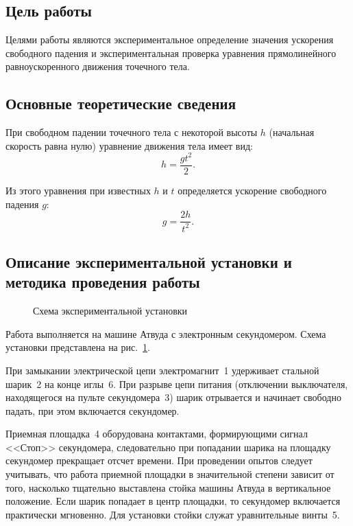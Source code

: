 \documentclass[a4paper, 12pt]{extarticle}
\begin{document}
\MTDTitlePage
\MTDInfoPage

\setcounter{section}{1}

\subsection{Цель работы}
Целями работы являются экспериментальное определение значения ускорения свободного падения и экспериментальная проверка уравнения прямолинейного равноускоренного движения точечного тела. 

\subsection{Основные теоретические сведения}
При свободном падении точечного тела с некоторой высоты $h$ (начальная скорость равна нулю) уравнение движения тела имеет вид: %
\begin{equation}
\label{eq:m1-free-fall-h}
h = \frac{gt^2}{2}.
\end{equation}

Из этого уравнения при известных $h$ и $t$ определяется ускорение свободного падения $g$: %
\begin{equation}
\label{eq:m1-free-fall-g}
g = \frac{2h}{t^2}.
\end{equation}

\subsection{Описание экспериментальной установки и методика проведения работы}
\begin{figure}[h] %
\caption{Схема экспериментальной установки \label{fig:m1-atwood-machine}}
\end{figure}
Работа выполняется на машине Атвуда с электронным секундомером. Схема установки представлена на рис.~\ref{fig:m1-atwood-machine}. %

При замыкании электрической цепи электромагнит~1 удерживает стальной шарик~2 на конце иглы~6. При разрыве цепи питания (отключении выключателя, находящегося на пульте секундомера~3) шарик отрывается и начинает свободно падать, при этом включается секундомер. %

Приемная площадка~4 оборудована контактами, формирующими сигнал <<Стоп>> секундомера, следовательно при попадании шарика на площадку секундомер прекращает отсчет времени. При проведении опытов следует учитывать, что работа приемной площадки в значительной степени зависит от того, насколько тщательно выставлена стойка машины Атвуда в вертикальное положение. Если шарик попадает в центр площадки, то секундомер включается практически мгновенно. Для установки стойки служат уравнительные винты~5. 
\end{document}
